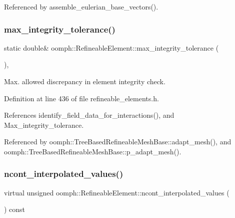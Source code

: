 Referenced by assemble\+\_\+eulerian\+\_\+base\+\_\+vectors().

\mbox{\label{classoomph_1_1RefineableElement_a25b5901fb0689aefe2c67c361f4290f2}} 
\subsubsection{\texorpdfstring{max\+\_\+integrity\+\_\+tolerance()}{max\_integrity\_tolerance()}}
{\footnotesize\ttfamily static double\& oomph\+::\+Refineable\+Element\+::max\+\_\+integrity\+\_\+tolerance (\begin{DoxyParamCaption}{ }\end{DoxyParamCaption})\hspace{0.3cm}{\ttfamily [inline]}, {\ttfamily [static]}}



Max. allowed discrepancy in element integrity check. 



Definition at line 436 of file refineable\+\_\+elements.\+h.



References identify\+\_\+field\+\_\+data\+\_\+for\+\_\+interactions(), and Max\+\_\+integrity\+\_\+tolerance.



Referenced by oomph\+::\+Tree\+Based\+Refineable\+Mesh\+Base\+::adapt\+\_\+mesh(), and oomph\+::\+Tree\+Based\+Refineable\+Mesh\+Base\+::p\+\_\+adapt\+\_\+mesh().

\mbox{\label{classoomph_1_1RefineableElement_a53e171a18c9f43f1db90a6876516a073}} 
\subsubsection{\texorpdfstring{ncont\+\_\+interpolated\+\_\+values()}{ncont\_interpolated\_values()}}
{\footnotesize\ttfamily virtual unsigned oomph\+::\+Refineable\+Element\+::ncont\+\_\+interpolated\+\_\+values (\begin{DoxyParamCaption}{ }\end{DoxyParamCaption}) const\hspace{0.3cm}{\ttfamily [pure virtual]}}



